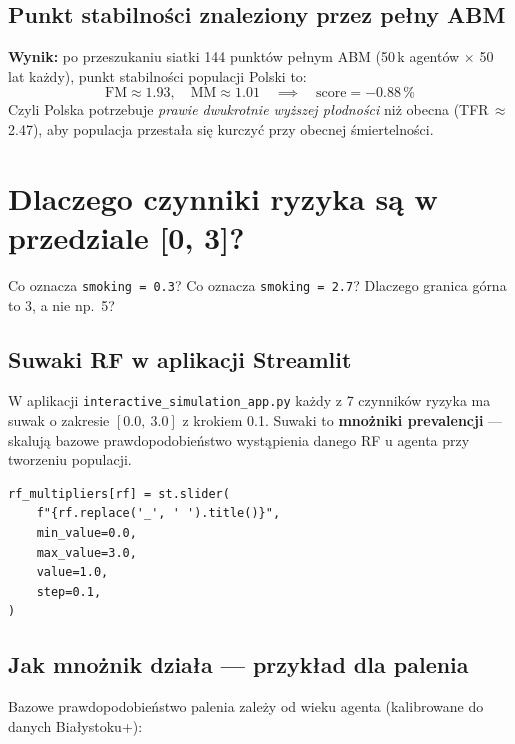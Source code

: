 \documentclass[11pt,a4paper]{article}
\begin{document}
\subsection{Punkt stabilności znaleziony przez pełny ABM}

\begin{infobox}
\textbf{Wynik:} po przeszukaniu siatki 144 punktów pełnym ABM (50\,k agentów $\times$ 50 lat każdy), punkt stabilności populacji Polski to:
\[
\text{FM} \approx 1.93, \quad \text{MM} \approx 1.01 \quad \implies \quad \text{score} = -0.88\,\%
\]
Czyli Polska potrzebuje \emph{prawie dwukrotnie wyższej płodności} niż obecna (TFR\,$\approx$\,2.47), aby populacja przestała się kurczyć przy obecnej śmiertelności.
\end{infobox}

\newpage
\section{Dlaczego czynniki ryzyka są w przedziale [0, 3]?}

\begin{qbox}
Co oznacza \texttt{smoking = 0.3}? Co oznacza \texttt{smoking = 2.7}? Dlaczego granica górna to 3, a nie np.\ 5?
\end{qbox}

\subsection{Suwaki RF w aplikacji Streamlit}

W aplikacji \texttt{interactive\_simulation\_app.py} każdy z 7 czynników ryzyka ma suwak o zakresie $[0.0,\ 3.0]$ z krokiem 0.1. Suwaki to \textbf{mnożniki prevalencji} --- skalują bazowe prawdopodobieństwo wystąpienia danego RF u agenta przy tworzeniu populacji.

\begin{lstlisting}
rf_multipliers[rf] = st.slider(
    f"{rf.replace('_', ' ').title()}",
    min_value=0.0,
    max_value=3.0,
    value=1.0,
    step=0.1,
)
\end{lstlisting}

\subsection{Jak mnożnik działa --- przykład dla palenia}

Bazowe prawdopodobieństwo palenia zależy od wieku agenta (kalibrowane do danych Białystoku+):
\end{document}
